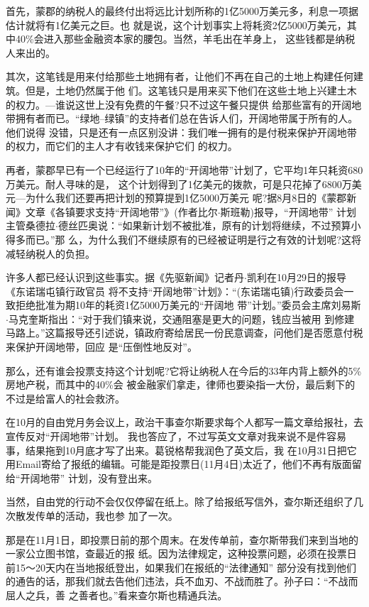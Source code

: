 ﻿\documentclass[11pt]{article}
\begin{document}
首先，蒙郡的纳税人的最终付出将远比计划所称的1亿5000万美元多，利息一项据估计就将有1亿美元之巨。也
就是说，这个计划事实上将耗资2亿5000万美元，其中40\%会进入那些金融资本家的腰包。当然，羊毛出在羊身上，
这些钱都是纳税人来出的。

其次，这笔钱是用来付给那些土地拥有者，让他们不再在自己的土地上构建任何建筑。但是，土地仍然属于他
们。这笔钱只是用来买下他们在这些土地上兴建土木的权力。---谁说这世上没有免费的午餐?只不过这午餐只提供
给那些富有的开阔地带拥有者而已。``绿地--绿镇''的支持者们总在告诉人们，开阔地带属于所有的人。他们说得
没错，只是还有一点区别没讲：我们唯一拥有的是付税来保护开阔地带的权力，而它们的主人才有收钱来保护它们
的权力。

再者，蒙郡早已有一个已经运行了10年的``开阔地带''计划了，它平均1年只耗资680万美元。耐人寻味的是，
这个计划得到了1亿美元的拨款，可是只花掉了6800万美元---为什么我们还要再把计划的预算提到1亿5000万美元
呢?据8月8日的《蒙郡新闻》文章《各镇要求支持``开阔地带''》(作者比尔$\cdot$斯班勒)报导，``开阔地带''
计划主管桑德拉$\cdot$德丝匹奥说：``如果新计划不被批准，原有的计划将继续，不过预算小得多而已。''那
么，为什么我们不继续原有的已经被证明是行之有效的计划呢?这将减轻纳税人的负担。

许多人都已经认识到这些事实。据《先驱新闻》记者丹$\cdot$凯利在10月29日的报导《东诺瑞屯镇行政官员
将不支持``开阔地带''计划》：``(东诺瑞屯镇)行政委员会一致拒绝批准为期10年的耗资1亿5000万美元的``开阔地
带''计划。''委员会主席刘易斯$\cdot$马克奎斯指出：``对于我们镇来说，交通阻塞是更大的问题，钱应当被用
到修建马路上。''这篇报导还引述说，镇政府寄给居民一份民意调查，问他们是否愿意付税来保护开阔地带，回应
是``压倒性地反对''。

那么，还有谁会投票支持这个计划呢?它将让纳税人在今后的33年内背上额外的5\%房地产税，而其中的40\%会
被金融家们拿走，律师也要染指一大份，最后剩下的不过是给富人的社会救济。

在10月的自由党月务会议上，政治干事查尔斯要求每个人都写一篇文章给报社，去宣传反对``开阔地带''计划。
我也答应了，不过写英文文章对我来说不是件容易事，结果拖到10月底才写了出来。葛锐格帮我润色了英文后，我
在10月31日把它用Email寄给了报纸的编辑。可能是距投票日(11月4日)太近了，他们不再有版面留给``开阔地带''
计划，没有登出来。

当然，自由党的行动不会仅仅停留在纸上。除了给报纸写信外，查尔斯还组织了几次散发传单的活动，我也参
加了一次。

那是在11月1日，即投票日前的那个周末。在发传单前，查尔斯带我们来到当地的一家公立图书馆，查最近的报
纸。因为法律规定，这种投票问题，必须在投票日前15～20天内在当地报纸登出，如果我们在报纸的``法律通知''
部分没有找到他们的通告的话，那我们就去告他们违法，兵不血刃、不战而胜了。孙子曰：``不战而屈人之兵，善
之善者也。''看来查尔斯也精通兵法。
\end{document}
